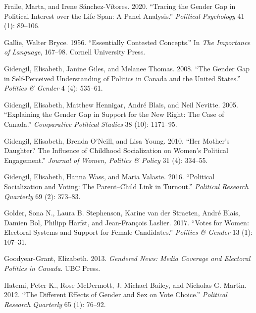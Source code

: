 \documentclass[
  letterpaper,
  DIV=11,
  numbers=noendperiod]{scrreprt}
\newlength{\cslhangindent}
\newlength{\cslentryspacingunit} %
\newenvironment{CSLReferences}[2] %
 {%
  \setlength{\parindent}{0pt}
  \ifodd #1
  \let\oldpar\par
  \def\par{\hangindent=\cslhangindent\oldpar}
  \fi
  \setlength{\parskip}{#2\cslentryspacingunit}
 }%
 {}
\begin{document}
\begin{CSLReferences}{1}{0}
\leavevmode{}%
Fraile, Marta, and Irene Sánchez-Vítores. 2020. {``{Tracing the Gender
Gap in Political Interest over the Life Span: A Panel Analysis}.''}
\emph{Political Psychology} 41 (1): 89--106.

\leavevmode{}%
Gallie, Walter Bryce. 1956. {``{Essentially Contested Concepts}.''} In
\emph{{The Importance of Language}}, 167--98. Cornell University Press.

\leavevmode{}%
Gidengil, Elisabeth, Janine Giles, and Melanee Thomas. 2008. {``{The
Gender Gap in Self-Perceived Understanding of Politics in Canada and the
United States}.''} \emph{Politics \& Gender} 4 (4): 535--61.

\leavevmode{}%
Gidengil, Elisabeth, Matthew Hennigar, André Blais, and Neil Nevitte.
2005. {``{Explaining the Gender Gap in Support for the New Right: The
Case of Canada}.''} \emph{Comparative Political Studies} 38 (10):
1171--95.

\leavevmode{}%
Gidengil, Elisabeth, Brenda O'Neill, and Lisa Young. 2010. {``{Her
Mother's Daughter? The Influence of Childhood Socialization on Women's
Political Engagement}.''} \emph{Journal of Women, Politics \& Policy} 31
(4): 334--55.

\leavevmode{}%
Gidengil, Elisabeth, Hanna Wass, and Maria Valaste. 2016. {``{Political
Socialization and Voting: The Parent--Child Link in Turnout}.''}
\emph{Political Research Quarterly} 69 (2): 373--83.

\leavevmode{}%
Golder, Sona N., Laura B. Stephenson, Karine van der Straeten, André
Blais, Damien Bol, Philipp Harfst, and Jean-François Laslier. 2017.
{``{Votes for Women: Electoral Systems and Support for Female
Candidates}.''} \emph{Politics \& Gender} 13 (1): 107--31.

\leavevmode{}%
Goodyear-Grant, Elizabeth. 2013. \emph{{Gendered News: Media Coverage
and Electoral Politics in Canada}}. UBC Press.

\leavevmode{}%
Hatemi, Peter K., Rose McDermott, J. Michael Bailey, and Nicholas G.
Martin. 2012. {``{The Different Effects of Gender and Sex on Vote
Choice}.''} \emph{Political Research Quarterly} 65 (1): 76--92.


\end{CSLReferences}
\end{document}
